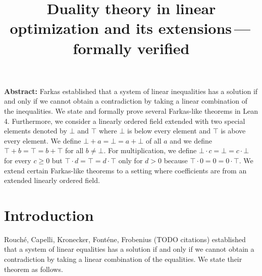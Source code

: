 \documentclass[]{article}
\renewcommand{\.}{\hskip .75pt}
\begin{document}


\title{Duality theory in linear optimization and its extensions\,---\,formally verified}
\date{}
\maketitle


\noindent \textbf{Abstract:}\;
Farkas established that a system of linear inequalities has a solution if and only if we cannot obtain
a contradiction by taking a linear combination of the inequalities.
We state and formally prove several Farkas-like theorems in Lean 4.
Furthermore, we consider a linearly ordered field extended with two special elements denoted by $\bot$ and $\top$
where $\bot$ is below every element and $\top$ is above every element.
We define $\bot + a = \bot = a + \bot$ of all $a$ and we define $\top + b = \top = b + \top$ for all $b \neq \bot$.
For multiplication, we define $\bot \cdot c = \bot = c \cdot \bot$ for every $c \ge 0$ but
$\top \cdot d = \top = d \cdot \top$ only for $d > 0$ because $\top \cdot 0 = 0 = 0 \cdot \top$.
We extend certain Farkas-like theorems to a setting where coefficients are from an extended linearly ordered field.


\section{Introduction}

Rouché, Capelli, Kronecker, Fonténe, Frobenius (TODO citations) established that
a system of linear equalities has a solution if and only if
we cannot obtain a contradiction by taking a linear combination of the equalities.
We state their theorem as follows.
\end{document}
